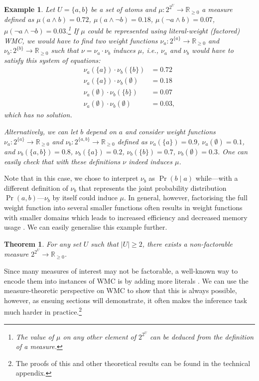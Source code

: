 \documentclass{article}
\newtheorem{example}{Example}
\newtheorem{theorem}{Theorem}
\begin{document}
\begin{example}
  Let $U = \{a, b\}$ be a set of atoms and $\mu\colon 2^{2^U} \to
  \mathbb{R}_{\ge 0}$ a measure defined as $\mu(a \land b) = 0.72$, $\mu(a \land
  \neg b) = 0.18$, $\mu(\neg a \land b) = 0.07$, $\mu(\neg a \land \neg b) =
  0.03$.\footnote{The value of $\mu$ on any other element of $2^{2^U}$ can be
    deduced from the definition of a measure.} If $\mu$ could be represented
  using literal-weight (factored) WMC, we would have to find two weight
  functions $\nu_a\colon 2^{\{a\}} \to \mathbb{R}_{\ge 0}$ and $\nu_b\colon
  2^{\{b\}} \to \mathbb{R}_{\ge 0}$ such that $\nu = \nu_a \cdot \nu_b$ induces
  $\mu$, i.e., $\nu_a$ and $\nu_b$ would have to satisfy this system of
  equations:
  \begin{align*}
    \nu_a(\{a\}) \cdot \nu_b(\{b\}) &= 0.72 \\
    \nu_a(\{a\}) \cdot \nu_b(\emptyset) &= 0.18 \\
    \nu_a(\emptyset) \cdot \nu_b(\{b\}) &= 0.07 \\
    \nu_a(\emptyset) \cdot \nu_b(\emptyset) &= 0.03,
  \end{align*}
  which has no solution.

  Alternatively, we can let $b$ depend on $a$ and consider weight functions
  $\nu_a\colon 2^{\{a\}} \to \mathbb{R}_{\ge 0}$ and $\nu_b\colon 2^{\{a, b\}}
  \to \mathbb{R}_{\ge 0}$ defined as $\nu_a(\{a\}) = 0.9$, $\nu_a(\emptyset) =
  0.1$, and $\nu_b(\{a, b\}) = 0.8$, $\nu_b(\{a\}) = 0.2$, $\nu_b(\{b\}) = 0.7$,
  $\nu_b(\emptyset) = 0.3$. One can easily check that with these definitions
  $\nu$ indeed induces $\mu$.
\end{example}

Note that in this case, we chose to interpret $\nu_b$ as $\Pr(b \mid a)$
while---with a different definition of $\nu_b$ that represents the joint
probability distribution $\Pr(a, b)$---$\nu_b$ by itself could induce $\mu$. In
general, however, factorising the full weight function into several smaller
functions often results in weight functions with smaller domains which leads to
increased efficiency and decreased memory usage \cite{DBLP:conf/aaai/DudekPV20}.
We can easily generalise this example further.

\begin{theorem}
  For any set $U$ such that $|U| \ge 2$, there exists a non-factorable measure
  $2^{2^{U}} \to \mathbb{R}_{\ge 0}$.
\end{theorem}

Since many measures of interest may not be factorable, a well-known way to
encode them into instances of WMC is by adding more literals
\cite{DBLP:journals/ai/ChaviraD08}. We can use the measure-theoretic perspective
on WMC to show that this is always possible, however, as ensuing sections will
demonstrate, it often makes the inference task much harder in
practice.\footnote{The proofs of this and other theoretical results can be found
in the technical appendix.}
\end{document}
